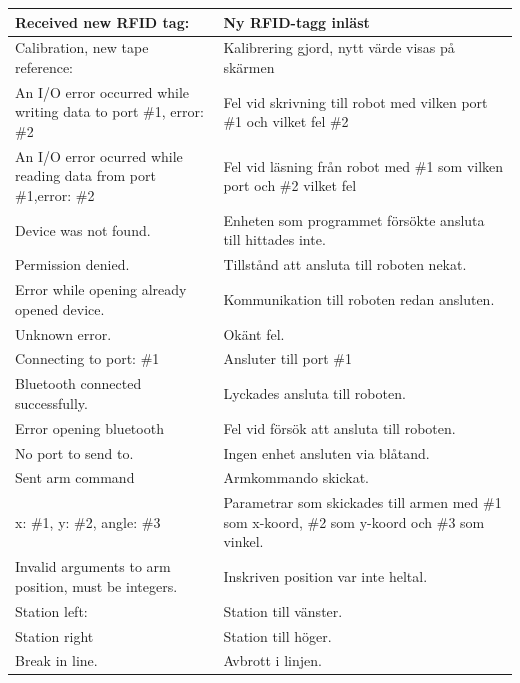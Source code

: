 \documentclass[a4paper,12pt]{article}
\begin{document}
\begin{longtable}{|p{}|p{}|}
        Received new RFID tag:  &  Ny RFID-tagg inläst \\ \hline
        Calibration, new tape reference:  & Kalibrering gjord, nytt värde visas på skärmen \\ \hline
        An I/O error occurred while writing data to port \#1, error: \#2 & Fel vid skrivning till robot med vilken port \#1 och vilket fel \#2\\ \hline
        An I/O error ocurred while reading data from port \#1,error: \#2 & Fel vid läsning från robot med \#1 som vilken port och \#2 vilket fel\\ \hline
        Device was not found. & Enheten som programmet försökte ansluta till hittades inte. \\ \hline
        Permission denied. & Tillstånd att ansluta till roboten nekat. \\ \hline
        Error while opening already opened device. & Kommunikation till roboten redan ansluten. \\ \hline
        Unknown error. & Okänt fel.\\ \hline
        Connecting to port: \#1 & Ansluter till port \#1  \\ \hline
        Bluetooth connected successfully. & Lyckades ansluta till roboten. \\ \hline
        Error opening bluetooth & Fel vid försök att ansluta till roboten.\\ \hline
        No port to send to. & Ingen enhet ansluten via blåtand. \\ \hline
        Sent arm command & Armkommando skickat. \\ \hline
        x: \#1, y: \#2, angle: \#3 & Parametrar som skickades till armen med \#1 som x-koord, \#2 som y-koord och \#3 som vinkel. \\ \hline
        Invalid arguments to arm position, must be integers. & Inskriven position var inte heltal. \\ \hline
        Station left:  & Station till vänster. \\ \hline
        Station right & Station till höger. \\ \hline
        Break in line. & Avbrott i linjen.
\label{tab:logg}
\end{longtable}
\end{document}
